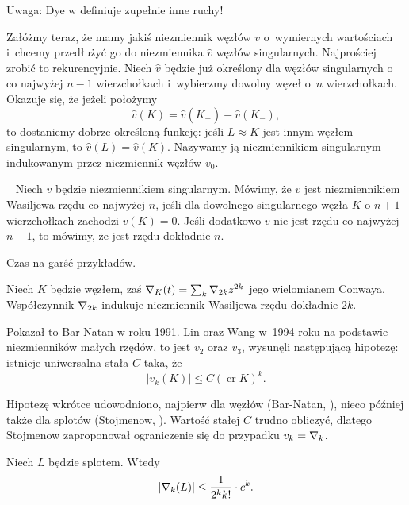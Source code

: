Uwaga: Dye w \cite{dye16} definiuje zupełnie inne ruchy!

Załóżmy teraz, że mamy jakiś niezmiennik węzłów $v$ o~wymiernych wartościach i~chcemy przedłużyć go do niezmiennika $\hat v$ węzłów singularnych.
Najprościej zrobić to rekurencyjnie.
Niech $\hat v$ będzie już określony dla węzłów singularnych o co najwyżej $n - 1$ wierzchołkach i~wybierzmy dowolny węzeł o~$n$ wierzchołkach.
Okazuje się, że jeżeli położymy
\begin{equation}
    \hat v(K) = \hat v(K_+) - \hat v(K_-),
\end{equation}
to dostaniemy dobrze określoną funkcję: jeśli $L \approx K$ jest innym węzłem singularnym, to $\hat v(L) = \hat v(K)$.
Nazywamy ją niezmiennikiem singularnym indukowanym przez niezmiennik węzłów $v_0$.

\begin{definition}\
    \label{def:vassiliev_order}
    Niech $v$ będzie niezmiennikiem singularnym.
    Mówimy, że $v$ jest niezmiennikiem Wasiljewa rzędu co najwyżej $n$, jeśli dla dowolnego singularnego węzła $K$ o $n + 1$ wierzchołkach zachodzi $v(K) = 0$.
    Jeśli dodatkowo $v$ nie jest rzędu co najwyżej $n - 1$, to mówimy, że jest rzędu dokładnie $n$.
\end{definition}

Czas na garść przykładów.

\begin{example}
    Niech $K$ będzie węzłem, zaś $\nabla_K(t) = \sum_k \nabla_{2k} z^{2k}$ jego wielomianem Conwaya.
    Współczynnik $\nabla_{2k}$ indukuje niezmiennik Wasiljewa rzędu dokładnie $2k$.
\end{example}

Pokazał to Bar-Natan w roku 1991.
Lin oraz Wang w~1994 roku na podstawie niezmienników małych rzędów, to jest $v_2$ oraz $v_3$, wysunęli następującą hipotezę: istnieje uniwersalna stała $C$ taka, że
\begin{equation}
    |v_k(K)| \le C (\operatorname{cr} K)^k.
\end{equation}

Hipotezę wkrótce udowodniono, najpierw dla węzłów (Bar-Natan, \cite{barnatan95}), nieco później także dla splotów (Stojmenow, \cite{stoimenow_01}).
Wartość stałej $C$ trudno obliczyć, dlatego Stojmenow zaproponował ograniczenie się do przypadku $v_k = \nabla_k$.

\begin{conjecture}
    Niech $L$ będzie splotem.
    Wtedy
    \begin{equation}
        |\nabla_k(L)| \le \frac{1}{2^kk!} \cdot c^k.
    \end{equation}
\end{conjecture}

